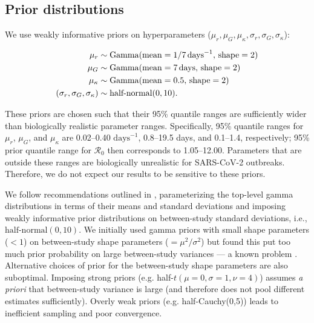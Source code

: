 \documentclass[12pt]{article}
\newcommand{\Ro}{\ensuremath{{\mathcal R}_{0}}\xspace}
\begin{document}
\subsection{Prior distributions}

We use weakly informative priors on hyperparameters ($\mu_r, \mu_G, \mu_\kappa, \sigma_r, \sigma_G, \sigma_\kappa$):
\begin{linenomath*}
\begin{equation}
\begin{aligned}
\mu_r &\sim \mathrm{Gamma}(\mathrm{mean}=1/7\,\mathrm{days}^{-1},\,\mathrm{shape}=2)\\
\mu_G &\sim \mathrm{Gamma}(\mathrm{mean}=7\,\mathrm{days},\,\mathrm{shape}=2)\\
\mu_\kappa &\sim \mathrm{Gamma}(\mathrm{mean}=0.5,\,\mathrm{shape}=2)\\
(\sigma_r, \sigma_G, \sigma_\kappa) &\sim \textrm{half-normal}(0, 10).
\end{aligned}
\end{equation}
\end{linenomath*}
These priors are chosen such that their 95\% quantile ranges are sufficiently wider than biologically realistic parameter ranges.
Specifically, 95\% quantile ranges for $\mu_r$, $\mu_G$, and $\mu_\kappa$ are 0.02--0.40 $\mathrm{days}^{-1}$, 0.8--19.5 days, and 0.1--1.4, respectively;
95\% prior quantile range for \Ro then corresponds to 1.05--12.00.
Parameters that are outside these ranges are biologically unrealistic for SARS-CoV-2 outbreaks.
Therefore, we do not expect our results to be sensitive to these priors.

We follow recommendations outlined in \cite{gelman2006prior}, parameterizing the top-level gamma distributions in terms of their means and standard deviations and imposing weakly informative prior distributions on between-study standard deviations, i.e., $\textrm{half-normal}(0, 10)$.
We initially used gamma priors with small shape parameters ($< 1$) on between-study shape parameters ($=\mu^2/\sigma^2$) but found this put too much prior probability on large between-study variances --- a known problem \citep{gelman2006prior}.
Alternative choices of prior for the between-study shape parameters are also suboptimal. 
Imposing strong priors (e.g. half-$t(\mu=0,\sigma=1,\nu=4)$) assumes \textit{a priori} that between-study variance is large (and therefore does not pool different estimates sufficiently).
Overly weak priors (e.g. half-Cauchy(0,5)) leads to inefficient sampling and poor convergence.
\end{document}
